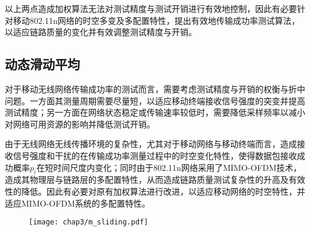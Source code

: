 以上两点造成加权算法无法对测试精度与测试开销进行有效地控制，因此有必要针对移动802.11n网络的时空多变及多配置特性，提出有效地传输成功率测试算法，以适应链路质量的变化并有效调整测试精度与开销。

\subsection{动态滑动平均}
\label{sec:sliding}

对于移动无线网络传输成功率的测试而言，需要考虑测试精度与开销的权衡与折中问题。一方面其测量周期需要尽量短，以适应移动终端接收信号强度的突变并提高测试精度；另一方面在网络状态稳定或传输速率较低时，需要降低采样频率以减小对网络可用资源的影响并降低测试开销。

由于无线网络无线传播环境的复杂性，尤其对于移动网络与移动终端而言，造成接收信号强度和干扰的在传输成功率测量过程中的时空变化特性，使得数据包接收成功概率$p_i$在短时间尺度内变化；同时由于802.11n网络采用了MIMO-OFDM技术，造成其物理层与链路层的多配置特性，从而造成链路质量测试复杂性的升高及有效性的降低。因此有必要对原有加权算法进行改进，以适应移动网络的时空特性，并适应MIMO-OFDM系统的多配置特性。

\begin{figure}[!htp]
\centering
    \texttt{[image: chap3/m\_sliding.pdf]}
\end{figure}

